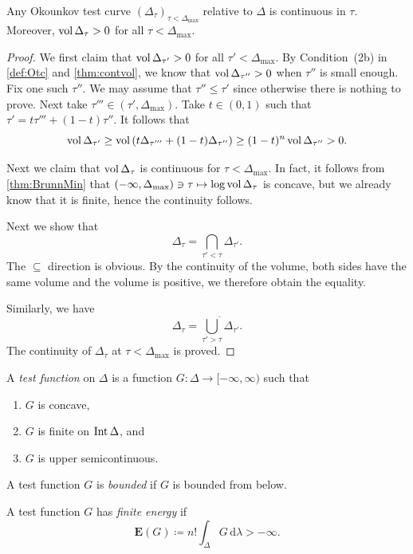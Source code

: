 \begin{proposition}\label{prop:Otccont}
	Any Okounkov test curve $(\Delta_{\tau})_{\tau< \Delta_{\max}}$ relative to $\Delta$ is continuous in $\tau$. Moreover, $\operatorname{vol} \Delta_{\tau}>0$ for all $\tau<\Delta_{\max}$.
\end{proposition}
\begin{proof}
    We first claim that $\operatorname{vol}\Delta_{\tau'}>0$ for all $\tau'<\Delta_{\max}$. By Condition~(2b) in \cref{def:Otc} and \cref{thm:contvol}, we know that $\operatorname{vol}\Delta_{\tau''}>0$ when $\tau''$ is small enough. Fix one such $\tau''$.
    We may assume that $\tau''\leq \tau'$ since otherwise there is nothing to prove. Next take $\tau'''\in (\tau',\Delta_{\max})$. Take $t\in (0,1)$ such that $\tau'=t\tau'''+(1-t)\tau''$. It follows that
    \[
    \operatorname{vol} \Delta_{\tau'}\geq \operatorname{vol} \left( t\Delta_{\tau'''}+(1-t)\Delta_{\tau''}\right)\geq (1-t)^n\operatorname{vol} \Delta_{\tau''}>0.
    \]

	Next we claim that $\operatorname{vol}\Delta_{\tau}$ is continuous for $\tau< \Delta_{\max}$. In fact, it follows from \cref{thm:BrunnMin} that $(-\infty,\Delta_{\max}) \ni \tau\mapsto \log \operatorname{vol}\Delta_{\tau}$ is concave, but we already know that it is finite, hence the continuity follows.

	Next we show that
	\[
		\Delta_{\tau}=\bigcap_{\tau'<\tau}\Delta_{\tau'}.
	\]
	The $\subseteq$ direction is obvious. By the continuity of the volume, both sides have the same volume and the volume is positive, we therefore obtain the equality.

	Similarly, we have
	\[
		\Delta_{\tau}=\overline{\bigcup_{\tau'>\tau}\Delta_{\tau'}}.
	\]
	The continuity of $\Delta_{\tau}$ at $\tau<\Delta_{\max}$ is proved.
\end{proof}

\begin{definition}\label{def:tf}
    A \emph{test function} on $\Delta$ is a function $G\colon \Delta\rightarrow [-\infty,\infty)$ such that
	\begin{enumerate}
		\item\label{itm:def:tf:1} $G$ is concave,
		\item\label{itm:def:tf:2} $G$ is finite on $\operatorname{Int} \Delta$, and
		\item\label{itm:def:tf:3} $G$ is upper semicontinuous.
	\end{enumerate}

    A test function $G$ is \emph{bounded} if $G$ is bounded from below.

    A test function $G$ has \emph{finite energy} if
 \begin{equation}\label{eq:EF}
	\mathbf{E}(G)\coloneqq n!\int_{\Delta} G\,\mathrm{d}\lambda>-\infty.
\end{equation}
\end{definition}

